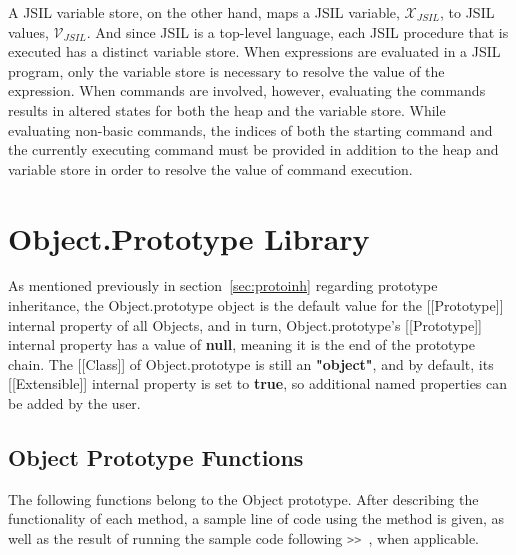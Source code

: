 \documentclass[a4paper,11pt,twoside]{report}
\def\jsinline{\lstinline[language=JavaScript, basicstyle=\small]}%\end{lstlisting}
\begin{document}
A JSIL variable store, on the other hand, maps a JSIL variable, $\mathcal{X}_{JSIL}$, to JSIL values, $\mathcal{V}_{JSIL}$. And since JSIL is a top-level language, each JSIL procedure that is executed has a distinct variable store. When expressions are evaluated in a JSIL program, only the variable store is necessary to resolve the value of the expression. When commands are involved, however, evaluating the commands results in altered states for both the heap and the variable store. While evaluating non-basic commands, the indices of both the starting command and the currently executing command must be provided in addition to the heap and variable store in order to resolve the value of command execution.

\chapter{Object.Prototype Library}
As mentioned previously in section~\ref{sec:protoinh} regarding prototype inheritance, the Object.prototype object is the default value for the [[Prototype]] internal property of all Objects, and in turn, Object.prototype's [[Prototype]] internal property has a value of \textbf{null}, meaning it is the end of the prototype chain. The [[Class]] of Object.prototype is still an \textbf{"object"}, and by default, its [[Extensible]] internal property is set to \textbf{true}, so additional named properties can be added by the user.

\section{Object Prototype Functions}
The following functions belong to the Object prototype. After describing the functionality of each method, a sample line of code using the method is given, as well as the result of running the sample code following \jsinline|>> |, when applicable.
\end{document}
